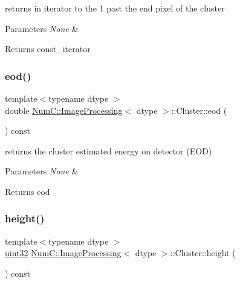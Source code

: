 returns in iterator to the 1 past the end pixel of the cluster


\begin{DoxyParams}{Parameters}
{\em None} & \\
\hline
\end{DoxyParams}
\begin{DoxyReturn}{Returns}
const\+\_\+iterator 
\end{DoxyReturn}
\mbox{\label{class_num_c_1_1_image_processing_1_1_cluster_ad1816507512dc817b9e3619ff482c9ed}} 
\subsubsection{\texorpdfstring{eod()}{eod()}}
{\footnotesize\ttfamily template$<$typename dtype $>$ \\
double \mbox{\hyperlink{class_num_c_1_1_image_processing}{Num\+C\+::\+Image\+Processing}}$<$ dtype $>$\+::Cluster\+::eod (\begin{DoxyParamCaption}{ }\end{DoxyParamCaption}) const\hspace{0.3cm}{\ttfamily [inline]}}

returns the cluster estimated energy on detector (E\+OD)


\begin{DoxyParams}{Parameters}
{\em None} & \\
\hline
\end{DoxyParams}
\begin{DoxyReturn}{Returns}
eod 
\end{DoxyReturn}
\mbox{\label{class_num_c_1_1_image_processing_1_1_cluster_a4b09031519932642dced2e943c5ce6d6}} 
\subsubsection{\texorpdfstring{height()}{height()}}
{\footnotesize\ttfamily template$<$typename dtype $>$ \\
\mbox{\hyperlink{namespace_num_c_ae685802ca6d3035f2b400b081e3953fa}{uint32}} \mbox{\hyperlink{class_num_c_1_1_image_processing}{Num\+C\+::\+Image\+Processing}}$<$ dtype $>$\+::Cluster\+::height (\begin{DoxyParamCaption}{ }\end{DoxyParamCaption}) const\hspace{0.3cm}{\ttfamily [inline]}}

